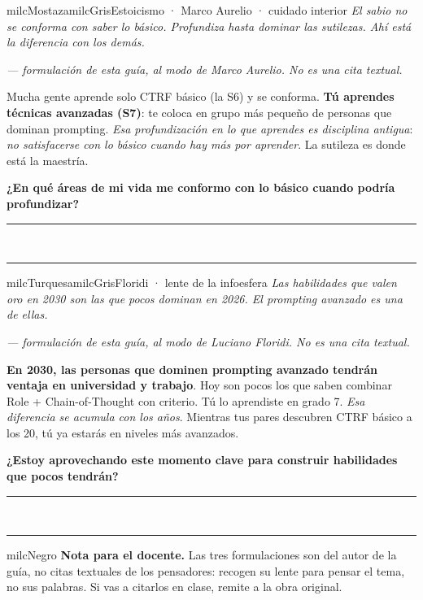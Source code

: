 \documentclass[11pt,letterpaper]{article}
\newcommand{\linead}[1]{\noindent\color{milcLinea}\rule{#1}{0.5pt}\color{milcNegro}}
\begin{document}
\begin{softbox}{milcMostaza}{milcGris}{Estoicismo · Marco Aurelio · cuidado interior}
\textit{El sabio no se conforma con saber lo básico. Profundiza hasta dominar las sutilezas. Ahí está la diferencia con los demás.}

{\footnotesize\itshape\color{milcNegro!70}--- formulación de esta guía, al modo de Marco Aurelio. No es una cita textual.}

Mucha gente aprende solo CTRF básico (la S6) y se conforma. \textbf{Tú aprendes técnicas avanzadas (S7)}: te coloca en grupo más pequeño de personas que dominan prompting. \emph{Esa profundización en lo que aprendes es disciplina antigua}: \emph{no satisfacerse con lo básico cuando hay más por aprender}. La sutileza es donde está la maestría.

\textbf{¿En qué áreas de mi vida me conformo con lo básico cuando podría profundizar?}
\end{softbox}
\linead{\linewidth}\\[1mm]
\linead{\linewidth}

\begin{softbox}{milcTurquesa}{milcGris}{Floridi · lente de la infoesfera}
\textit{Las habilidades que valen oro en 2030 son las que pocos dominan en 2026. El prompting avanzado es una de ellas.}

{\footnotesize\itshape\color{milcNegro!70}--- formulación de esta guía, al modo de Luciano Floridi. No es una cita textual.}

\textbf{En 2030, las personas que dominen prompting avanzado tendrán ventaja en universidad y trabajo}. Hoy son pocos los que saben combinar Role + Chain-of-Thought con criterio. Tú lo aprendiste en grado 7. \emph{Esa diferencia se acumula con los años}. Mientras tus pares descubren CTRF básico a los 20, tú ya estarás en niveles más avanzados.

\textbf{¿Estoy aprovechando este momento clave para construir habilidades que pocos tendrán?}
\end{softbox}
\linead{\linewidth}\\[1mm]
\linead{\linewidth}

\begin{infoband}{milcNegro}
\textbf{Nota para el docente.} Las tres formulaciones son del autor de la guía, no citas textuales de los pensadores: recogen su lente para pensar el tema, no sus palabras. Si vas a citarlos en clase, remite a la obra original.
\end{infoband}
\end{document}
